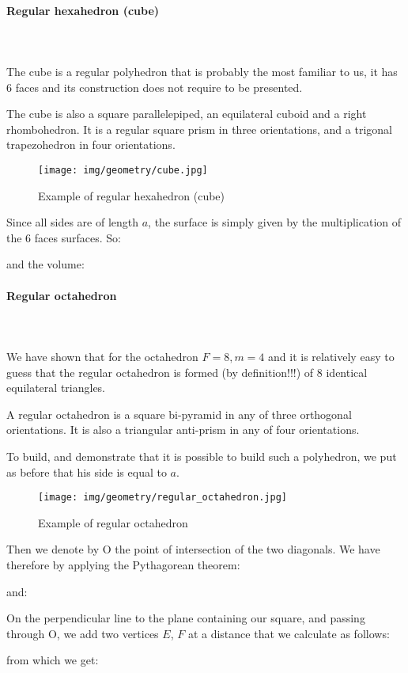 {	
	\pagebreak
	\paragraph{Regular hexahedron (cube)}\mbox{}\\\\
	The cube is a regular polyhedron that is probably the most familiar to us, it has $6$ faces and its construction  does not require to be presented.
	
	The cube is also a square parallelepiped, an equilateral cuboid and a right rhombohedron. It is a regular square prism in three orientations, and a trigonal trapezohedron in four orientations.
	\begin{figure}[H]
		\centering
		\texttt{[image: img/geometry/cube.jpg]}
		\caption{Example of regular hexahedron (cube)}
	\end{figure}
	Since all sides are of length $a$, the surface is simply given by the multiplication of the $6$ faces surfaces. So:
	
	and the volume:
	
	
	\paragraph{Regular octahedron}\mbox{}\\\\
	We have shown that for the octahedron $F=8,m=4$ and it is relatively easy to guess that the regular octahedron is formed (by definition!!!) of $8$ identical equilateral triangles.
	
	 A regular octahedron is a square bi-pyramid in any of three orthogonal orientations. It is also a triangular anti-prism in any of four orientations.
	
	To build, and demonstrate that it is possible to build such a polyhedron, we put as before that his side is equal to $a$.
	\begin{figure}[H]
		\centering
		\texttt{[image: img/geometry/regular\_octahedron.jpg]}
		\caption{Example of regular octahedron }
	\end{figure}
	Then we denote by O the point of intersection of the two diagonals. We have therefore by applying the Pythagorean theorem:
	
	and:
	
	On the perpendicular line to the plane containing our square, and passing through O, we add two vertices $E$, $F$ at a distance that we calculate as follows:
	
	from which we get:
	
}
